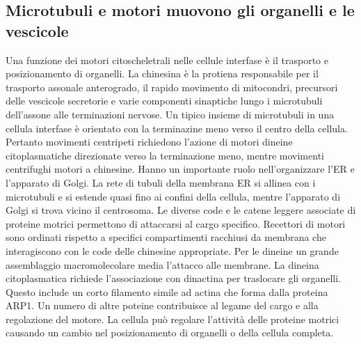 \subsection{Microtubuli e motori muovono gli organelli e le vescicole}
Una funzione dei motori citoscheletrali nelle cellule interfase \`e il trasporto e posizionamento di organelli. La chinesina \`e la protiena responsabile per il trasporto 
assonale anterogrado, il rapido movimento di mitocondri, precursori delle vescicole secretorie e varie componenti sinaptiche lungo i microtubuli dell'assone alle terminazioni nervose.
Un tipico insieme di microtubuli in una cellula interfase \`e orientato con la terminazine meno verso il centro della cellula. Pertanto movimenti centripeti richiedono l'azione di 
motori dineine citoplasmatiche direzionate verso la terminazione meno, mentre movimenti centrifughi motori a chinesine. Hanno un importante ruolo nell'organizzare l'ER e l'apparato di 
Golgi. La rete di tubuli della membrana ER si allinea con i microtubuli e si estende quasi fino ai confini della cellula, mentre l'apparato di Golgi si trova vicino il centrosoma. Le 
diverse code e le catene leggere associate di proteine motrici permettono di attaccarsi al cargo specifico. Recettori di motori sono ordinati rispetto a specifici compartimenti 
racchiusi da membrana che interagiscono con le code delle chinesine appropriate. Per le dineine un grande assemblaggio macromolecolare media l'attacco alle membrane. La dineina 
citoplasmatica richiede l'associazione con dinactina per traslocare gli organelli. Questo include un corto filamento simile ad actina che forma dalla proteina ARP1. Un numero di altre
poteine contribuisce al legame del cargo e alla regolazione del motore. La cellula pu\`o regolare l'attivit\`a delle proteine motrici causando un cambio nel posizionamento di 
organelli o della cellula completa. 
